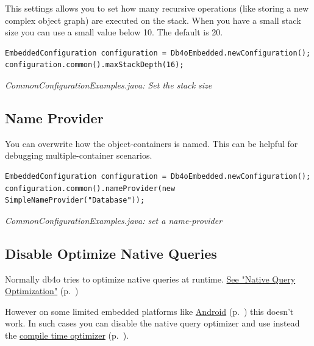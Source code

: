 This settings allows you to set how many recursive operations (like storing a new complex object graph) are executed on the stack. When you have a small stack size you can use a small value below 10. The default is 20.

\begin{lstlisting}
EmbeddedConfiguration configuration = Db4oEmbedded.newConfiguration();
configuration.common().maxStackDepth(16);
\end{lstlisting}

{\small\itshape CommonConfigurationExamples.java: Set the stack size\par}
\medskip

\subsection{Name Provider}
\label{ref:configuration-common-name-provider}

You can overwrite how the object-containers is named. This can be helpful for debugging multiple-container scenarios.

\begin{lstlisting}
EmbeddedConfiguration configuration = Db4oEmbedded.newConfiguration();
configuration.common().nameProvider(new SimpleNameProvider("Database"));
\end{lstlisting}

{\small\itshape CommonConfigurationExamples.java: set a name-provider\par}
\medskip

\subsection{Disable Optimize Native Queries}
\label{ref:configuration-common-disable-optimize-nq}

Normally db4o tries to optimize native queries at runtime. \hyperref[ref:basics-querying-native-queries-native-query-optimization]{See "Native Query Optimization"} (p.~\pageref{ref:basics-querying-native-queries-native-query-optimization})

However on some limited embedded platforms like \hyperref[ref:platform-specific-issues-android-native-queries]{Android} (p.~\pageref{ref:platform-specific-issues-android-native-queries}) this doesn't work. In such cases you can disable the native query optimizer and use instead the \hyperref[ref:advanced-topics-enhancement-tools]{compile time optimizer} (p.~\pageref{ref:advanced-topics-enhancement-tools}).

